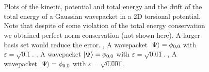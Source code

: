 \begin{figure}
{  } \\
   \\
  \caption[Plots of the energies and drifts of a Gaussian in a torsional potential]{
    Plots of the kinetic, potential and total energy and the drift of the total energy
    of a Gaussian wavepacket in a 2D torsional potential. Note that despite of some violation of
    the total energy conservation we obtained perfect norm conservation (not shown here).
    A larger basis set would reduce the error.
    , 
    A wavepacket $\Ket{\Psi} = \phi_{0,0}$ with $\varepsilon = \sqrt{0.1}$.
    , 
    A wavepacket $\Ket{\Psi} = \phi_{0,0}$ with $\varepsilon = \sqrt{0.01}$.
    , 
    A wavepacket $\Ket{\Psi} = \phi_{0,0}$ with $\varepsilon = \sqrt{0.001}$.
    \label{fig:torsional_energies}
  }
\end{figure}


